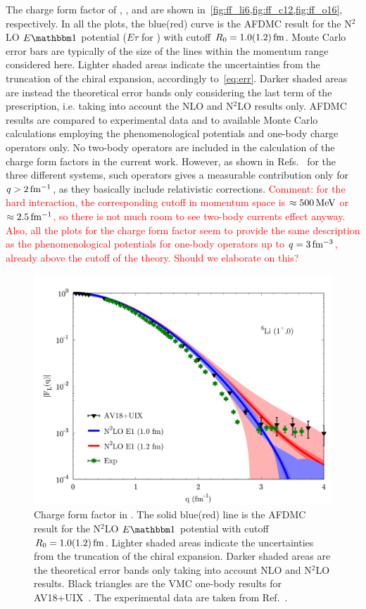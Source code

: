 \documentclass[aps,prc,twocolumn,superscriptaddress,floatfix]{revtex4-1}
\newcommand{\red}[1]{\protect\textcolor{red}{#1}}
\begin{document}
The charge form factor of , , and  are shown 
in~\cref{fig:ff_li6,fig:ff_c12,fig:ff_o16}, respectively. In all the plots, the blue(red) curve
is the AFDMC result for the N$^2$LO $E\mathbbm1$ potential ($E\tau$ for ) with cutoff $R_0=1.0(1.2)\,\rm fm$.
Monte Carlo error bars are typically of the size of the lines within the momentum 
range considered here. Lighter shaded areas indicate the uncertainties from 
the truncation of the chiral expansion, accordingly to~\cref{eq:err}.
Darker shaded areas are instead the theoretical error bands only considering the last
term of the prescription, i.e. taking into account the NLO and N$^2$LO results only.
AFDMC results are compared to experimental data and to available Monte
Carlo calculations employing the phenomenological potentials and one-body charge operators only.
No two-body operators are included in the calculation of the charge form factors in the 
current work. However, as shown in Refs.~\cite{Wiringa:1998,Lovato:2013,Mihaila:2000} for the three
different systems, such operators gives a measurable contribution only 
for $q>2\,\rm fm^{-1}$, as they basically include relativistic corrections.
\red{Comment: for the hard interaction, the corresponding cutoff in momentum space is 
$\approx 500\,\rm MeV$ or $\approx2.5\,\rm fm^{-1}$, so there is not much room to see 
two-body currents effect anyway. Also, all the plots for the charge form factor seem to provide 
the same description as the phenomenological potentials for one-body operators up to
$q=3\,\rm fm^{-3}$, already above the cutoff of the theory. Should we elaborate on this?}

\begin{figure}[htb]
\includegraphics[width=\linewidth]{ff_li6_e1.pdf}
\caption[]{Charge form factor in . The solid blue(red) line is the AFDMC result for the
N$^2$LO $E\mathbbm1$ potential with cutoff $R_0=1.0(1.2)\,\rm fm$.
Lighter shaded areas indicate the uncertainties from the truncation of the chiral expansion.
Darker shaded areas are the theoretical error bands only taking into account NLO and N$^2$LO results. 
Black triangles are the VMC one-body results for AV18+UIX~\cite{Wiringa:1998}.
The experimental data are taken from Ref.~\cite{Li:1971}.}
\label{fig:ff_li6}
\end{figure}
\end{document}
